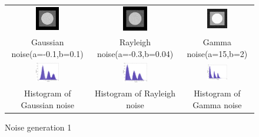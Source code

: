 \documentclass[11pt,a4paper]{article}
\begin{document}
\begin{figure}[!htbp]
	\centering
	\begin{tabular}{ccc} 
		\includegraphics[width=0.3\textwidth]{pro4/gaussian}&
		\includegraphics[width=0.3\textwidth]{pro4/rayleigh}&
		\includegraphics[width=0.3\textwidth]{pro4/gamma} \\
		Gaussian noise(a=-0.1,b=0.1) &  Rayleigh noise(a=-0.3,b=0.04) &  Gamma noise(a=15,b=2)\\
		\includegraphics[width=0.3\textwidth]{pro4/gaussianHist}&
		\includegraphics[width=0.3\textwidth]{pro4/rayleighHist}&
		\includegraphics[width=0.3\textwidth]{pro4/gammaHist} \\
		 Histogram of Gaussian noise &  Histogram of Rayleigh noise &  Histogram of Gamma noise
	\end{tabular}
	\caption{Noise generation 1}
	\label{pro4_fig1}
\end{figure}
\end{document}
